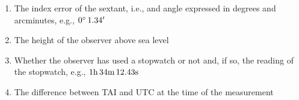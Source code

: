 \documentclass{ol-softwaremanual}
\begin{document}
\begin{enumerate}
  \item The index error of the sextant,  i.e., and angle expressed in degrees and arcminutes, e.g., $0 \degree \, 1.34'$
  \item The height of the observer above sea level
  \item Whether the observer has used a stopwatch or not and, if so, the reading of the stopwatch, e.g., $1\textrm{h} \, 34 \textrm{m} \, 12.43 \textrm{s}$
  \item The difference between \ac{TAI} and \ac{UTC} at the time of the measurement 
\end{enumerate}


\printacronyms[pages={display=all,seq/use=false}]




\end{document}
